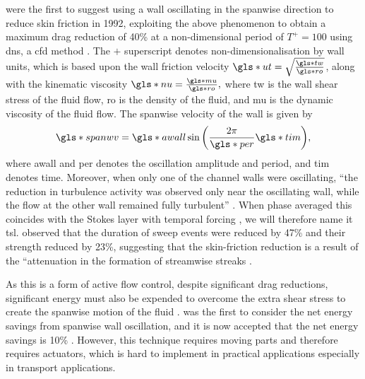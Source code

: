 \citeauthor*{jung1992} \cite{jung1992} were the first to suggest using a wall oscillating in the spanwise direction to reduce skin friction in 1992, exploiting the above phenomenon to obtain a maximum drag reduction of 40\% at a non-dimensional period of $T^+=100$ using \gls*{dns}, a \gls*{cfd} method \cite{karniadakis2003}. The $+$ superscript denotes non-dimensionalisation by wall units, which is based upon the wall friction velocity $\gls*{ut}=\sqrt{\frac{\gls*{tw}}{\gls*{ro}}}$, along with the kinematic viscosity $\gls*{nu}=\frac{\gls*{mu}}{\gls*{ro}},$ where \gls*{tw} is the wall shear stress of the fluid flow, \gls*{ro} is the density of the fluid, and \gls*{mu} is the dynamic viscosity of the fluid flow. The spanwise velocity of the wall is given by
\begin{equation}
	\gls*{spanwv} = \gls*{awall}\sin{\left( \frac{2\pi}{\gls*{per}}\gls*{tim} \right)}
,\end{equation}
where \gls*{awall} and \gls*{per} denotes the oscillation amplitude and period, and \gls*{tim} denotes time.
Moreover, when only one of the channel walls were oscillating, ``the reduction in turbulence activity was observed only near the oscillating wall, while the flow at the other wall remained fully turbulent'' \cite{jung1992}. When phase averaged this coincides with the Stokes layer with temporal forcing \cite{viotti2009}, we will therefore name it \gls*{tsl}. \textcite{dhanak1999} observed that the duration of sweep events were reduced by 47\% and their strength reduced by 23\%, suggesting that the skin-friction reduction is a result of the ``attenuation in the formation of streamwise streaks \cite{karniadakis2003}.

As this is a form of active flow control, despite significant drag reductions, significant energy must also be expended to overcome the extra shear stress to create the spanwise motion of the fluid \cite{viotti2009}. \textcite{baron1996} was the first to consider the net energy savings from spanwise wall oscillation, and it is now accepted that the net energy savings is 10\% \cite{viotti2009, karniadakis2003}. However, this technique requires moving parts and therefore requires actuators, which is hard to implement in practical applications especially in transport applications.

